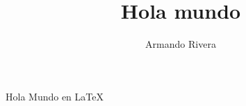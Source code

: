 \documentclass{article}
\title{Hola mundo}
\author{Armando Rivera}
\begin{document}
	\maketitle
	Hola Mundo en \LaTeX
\end{document}
